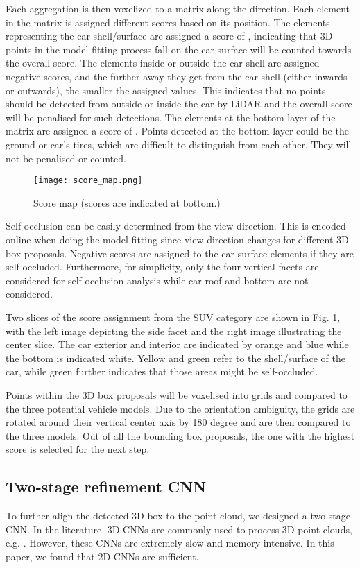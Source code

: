 \documentclass[letterpaper, 10 pt, conference]{ieeeconf}  \usepackage[
\begin{document}
Each aggregation is then voxelized to a  matrix along the  direction. Each element in the matrix is assigned different scores based on its position. The elements representing the car shell/surface are assigned a score of , indicating that 3D points in the model fitting process fall on the car surface will be counted towards the overall score. The elements inside or outside the car shell are assigned negative scores, and the further away they get from the car shell (either inwards or outwards), the smaller the assigned values. This indicates that no points should be detected from outside or inside the car by LiDAR and the overall score will be penalised for such detections. The elements at the bottom layer of the matrix are assigned a score of . Points detected at the bottom layer could be the ground or car's tires, which are difficult to distinguish from each other. They will not be penalised or counted.

\begin{figure}[h!]
\centering
     \texttt{[image: score\_map.png]}
    \caption{Score map (scores are indicated at bottom.)}
    \label{fig:Score map}
\end{figure}

Self-occlusion can be easily determined from the view direction. This is encoded online when doing the model fitting since view direction changes for different 3D box proposals. Negative scores are assigned to the car surface elements if they are self-occluded. Furthermore, for simplicity, only the four vertical facets are considered for self-occlusion analysis while car roof and bottom are not considered.

Two slices of the score assignment from the SUV category are shown in Fig. \ref{fig:Score map}, with the left image depicting the side facet and the right image illustrating the center slice. The car exterior and interior are indicated by orange and blue while the bottom is indicated white. Yellow and green refer to the shell/surface of the car, while green further indicates that those areas might be self-occluded.

Points within the 3D box proposals will be voxelised into  grids and compared to the three potential vehicle models. Due to the orientation ambiguity, the grids are rotated around their vertical center axis by 180 degree and are then compared to the three models. Out of all the bounding box proposals, the one with the highest score is selected for the next step.

\subsection{Two-stage refinement CNN}
To further align the detected 3D box to the point cloud, we designed a two-stage CNN. In the literature, 3D CNNs are commonly used to process 3D point clouds, e.g. \cite{li2016vehicle}. However, these CNNs are extremely slow and memory intensive. In this paper, we found that 2D CNNs are sufficient.
\end{document}
